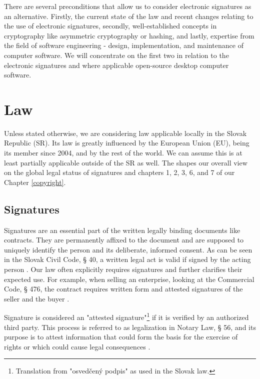 \documentclass[thesismargins, english, thesislinespacing, onelinechapterstyle, upjsfrontpage]{rnthesis}
\begin{document}
There are several preconditions that allow us to consider electronic signatures as an alternative.
Firstly, the current state of the law and recent changes relating to the use of electronic signatures, secondly, well-established concepts in cryptography like asymmetric cryptography or hashing, and lastly, expertise from the field of software engineering - design, implementation, and maintenance of computer software.
We will concentrate on the first two in relation to the electronic signatures and where applicable open-source desktop computer software.

\section{Law}

Unless stated otherwise, we are considering law applicable locally in the Slovak Republic (SR).
Its law is greatly influenced by the European Union (EU), being its member since 2004, and by the rest of the world.
We can assume this is at least partially applicable outside of the SR as well.
The \cite{law} shapes our overall view on the global legal status of signatures and chapters 1, 2, 3, 6, and 7 of \cite{osslicensing} our Chapter \ref{copyright}.

\subsection{Signatures}

Signatures are an essential part of the written legally binding documents like contracts.
They are permanently affixed to the document and are supposed to uniquely identify the person and its deliberate, informed consent.
As can be seen in the Slovak Civil Code, § 40, a written legal act is valid if signed by the acting person \cite{civilcode}.
Our law often explicitly requires signatures and further clarifies their expected use.
For example, when selling an enterprise, looking at the Commercial Code, § 476, the contract requires written form and attested signatures of the seller and the buyer \cite{commercialcode}.

Signature is considered an "attested signature"\footnote{Translation from "osvedčený podpis" as used in the Slovak law.} if it is verified by an authorized third party.
This process is referred to as legalization in Notary Law, § 56, and its purpose is to attest information that could form the basis for the exercise of rights or which could cause legal consequences \cite{notarylaw}.
\end{document}

